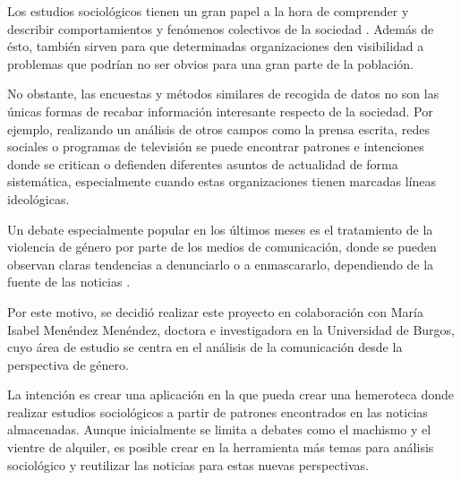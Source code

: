 
Los estudios sociológicos tienen un gran papel a la hora de comprender y describir comportamientos y fenómenos colectivos de la sociedad \cite{wiki:estudiosociologico}. Además de ésto, también sirven para que determinadas organizaciones den visibilidad a problemas que podrían no ser obvios para una gran parte de la población.

No obstante, las encuestas y métodos similares de recogida de datos no son las únicas formas de recabar información interesante respecto de la sociedad. Por ejemplo, realizando un análisis de otros campos como la prensa escrita, redes sociales o programas de televisión se puede encontrar patrones e intenciones donde se critican o defienden diferentes asuntos de actualidad de forma sistemática, especialmente cuando estas organizaciones tienen marcadas líneas ideológicas.

Un debate especialmente popular en los últimos meses es el tratamiento de la violencia de género por parte de los medios de comunicación, donde se pueden observan claras tendencias a denunciarlo o a enmascararlo, dependiendo de la fuente de las noticias \cite{RICD2653}.

Por este motivo, se decidió realizar este proyecto en colaboración con María Isabel Menéndez Menéndez, doctora e investigadora en la Universidad de Burgos, cuyo área de estudio se centra en el análisis de la comunicación desde la perspectiva de género. 

La intención es crear una aplicación en la que pueda crear una hemeroteca donde realizar estudios sociológicos a partir de patrones encontrados en las noticias almacenadas. Aunque inicialmente se limita a debates como el machismo y el vientre de alquiler, es posible crear en la herramienta más temas para análisis sociológico y reutilizar las noticias para estas nuevas perspectivas.

